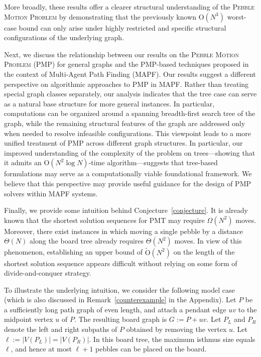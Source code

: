 \documentclass[letter,11pt]{article}
\theoremstyle{definition}
\theoremstyle{definition}
\newcommand{\1}{\boldmath$~1~$\unboldmath}
\newcommand{\Ord}{\mathrm{O}}
\begin{document}
More broadly, these results offer a clearer structural understanding of 
the \textsc{Pebble Motion Problem} by demonstrating that the previously known 
$\Ord(N^3)$ worst-case bound can only arise under highly restricted 
and specific structural configurations of the underlying graph.

Next, we discuss the relationship between our results on the 
\textsc{Pebble Motion Problem} (PMP) for general graphs and the 
PMP-based techniques proposed in the context of 
Multi-Agent Path Finding (MAPF).
Our results suggest a different perspective on algorithmic approaches to 
PMP in MAPF. Rather than treating special graph classes separately, 
our analysis indicates that the tree case can serve as a natural base 
structure for more general instances. In particular, computations can 
be organized around a spanning breadth-first search tree of the graph, 
while the remaining structural features of the graph are addressed only 
when needed to resolve infeasible configurations.
This viewpoint leads to a more unified treatment of PMP across different 
graph structures. In particular, our improved understanding of the 
complexity of the problem on trees—showing that it admits an 
$\Ord(N^2 \log N)$-time algorithm—suggests that tree-based formulations 
may serve as a computationally viable foundational framework. 
We believe that this perspective may provide useful guidance for the design 
of PMP solvers within MAPF systems.

Finally, we provide some intuition behind Conjecture~\ref{conjecture}.
It is already known that the shortest solution sequences for PMT
may require $\Omega(N^2)$ moves.
Moreover, there exist instances in which moving a single pebble
by a distance $\Theta(N)$ along the board tree already requires
$\Theta(N^2)$ moves.
In view of this phenomenon, establishing an upper bound of
$\tilde{\Ord}(N^2)$ on the length of the shortest solution sequence
appears difficult without relying on some form of divide-and-conquer
strategy.

To illustrate the underlying intuition, we consider the following
model case (which is also discussed in Remark~\ref{counterexample} 
in the Appendix).
Let $P$ be a sufficiently long path graph of even length, and attach
a pendant edge $uv$ to the midpoint vertex $u$ of $P$.
The resulting board graph is $G := P + uv$.
Let $P_L$ and $P_R$ denote the left and right subpaths of $P$
obtained by removing the vertex $u$.
Let $\ell := |V(P_L)| = |V(P_R)|$.
In this board tree, the maximum isthmus size equals $\ell$, and hence
at most $\ell+1$ pebbles can be placed on the board.
\end{document}
